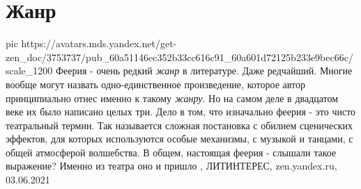  
 
 
 
 
\chapter{Жанр}

\ifcmt
  pic https://avatars.mds.yandex.net/get-zen_doc/3753737/pub_60a51146ec352b33cc616c91_60a601d72125b233e9bec66c/scale_1200
\fi
Феерия - очень редкий \emph{жанр} в литературе. Даже редчайший. Многие вообще могут
назвать одно-единственное произведение, которое автор принципиально отнес
именно к такому \emph{жанру}. Но на самом деле в двадцатом веке их было написано целых
три.  Дело в том, что изначально феерия - это чисто театральный термин. Так
называется сложная постановка с обилием сценических эффектов, для которых
используются особые механизмы, с музыкой и танцами, с общей атмосферой
волшебства. В общем, настоящая феерия - слышали такое выражение? Именно из
театра оно и пришло
, 
ЛИТИНТЕРЕС, zen.yandex.ru, 03.06.2021


